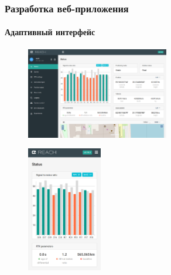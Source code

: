 \documentclass[xetex,t]{beamer}
\begin{document}
%
%
\begin{frame}
  \frametitle{Разработка веб-приложения}
  \framesubtitle{Адаптивный интерфейс}
  
  \begin{minipage}{\textwidth}
    \centering
    \begin{minipage}[c]{.5\textwidth}
      \centering
      \begin{figure}[c]
        \centering
        \includegraphics[height=4cm]{../img/reachview/homepage_responsive-lg}
      \end{figure}
    \end{minipage}
    \hspace{2em}
    \begin{minipage}[c]{.3\textwidth}
      \centering
      \begin{figure}[c]
        \centering
        \includegraphics[height=5.5cm]{../img/reachview/homepage_responsive-xs}
      \end{figure}
    \end{minipage}
  \end{minipage}
\end{frame}


\end{document}
